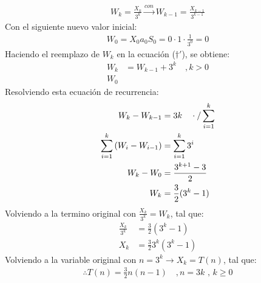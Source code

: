 \begin{solution}
\begin{align*}
    W_k = \frac{X_k}{3^k} \xrightarrow{con} W_{k-1}=\frac{X_{k-1}}{3^{k-1}}
\end{align*}
Con el siguiente nuevo valor inicial:
\begin{align*}
    W_0 = X_0a_0S_0 = 0\cdot 1\cdot \frac{1}{3^0} = 0
\end{align*}
Haciendo el reemplazo de $W_k$ en la ecuación ($\dagger'$), se obtiene:
\begin{align*}
    W_k &= W_{k-1} +3^k \quad, k>0\\
    W_0
\end{align*}
Resolviendo esta ecuación de recurrencia:
\begin{align*}
    W_k - W_{k-1} &= 3k \quad \cdot \text{/} \sum\limits_{i=1}^{k}\\
    \sum\limits_{i=1}^{k} \left(W_i - W_{i-1} \right) &= \sum\limits_{i=1}^{k}3^i \\
    W_k - W_0 &= \frac{3^{k+1}-3}{2}\\
    W_k &= \frac{3}{2}(3^k -1)
\end{align*}
Volviendo a la termino original con $\frac{X_k}{3^k}=W_k$, tal que:
\begin{align*}
    \frac{X_k}{3^k}&=\frac{3}{2}(3^k-1)\\
    X_k &= \frac{3}{2} 3^k (3^k -1)
\end{align*}
Volviendo a la variable original con $n=3^k \rightarrow X_k=T(n)$, tal que:
\begin{align*}
    \therefore T(n) = \frac{3}{2}n(n-1)\quad ,n=3k \text{ , } k\ge0
\end{align*}
\end{solution}